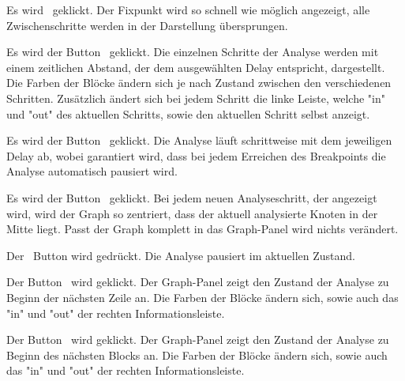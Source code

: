 \tests{}

{Es wird \faPlay\ geklickt.}
{Der Fixpunkt wird so schnell wie möglich angezeigt, alle Zwischenschritte werden in der Darstellung übersprungen.}

{Es wird der Button \faPlay\ geklickt.}
{Die einzelnen Schritte der Analyse werden mit einem zeitlichen Abstand, der dem ausgewählten Delay entspricht, dargestellt. Die Farben der Blöcke ändern sich je nach Zustand zwischen den verschiedenen Schritten. Zusätzlich ändert sich bei jedem Schritt die linke Leiste, welche "in" und "out" des aktuellen Schritts, sowie den aktuellen Schritt selbst anzeigt.}

{Es wird der Button \faPlay\ geklickt.}
{Die Analyse läuft schrittweise mit dem jeweiligen Delay ab, wobei garantiert wird, dass bei jedem Erreichen des Breakpoints die Analyse automatisch pausiert wird.}

{Es wird der Button \faPlay\ geklickt.}
{Bei jedem neuen Analyseschritt, der angezeigt wird, wird der Graph so zentriert, dass der aktuell analysierte Knoten in der Mitte liegt. Passt der Graph komplett in das Graph-Panel wird nichts verändert.}


\tests{}

{Der \faStop\ Button wird gedrückt.}
{Die Analyse pausiert im aktuellen Zustand.}

{Der Button \faForward\ wird geklickt.}
{Der Graph-Panel zeigt den Zustand der Analyse zu Beginn der nächsten Zeile an. Die Farben der Blöcke ändern sich, sowie auch das "in" und "out" der rechten Informationsleiste.}

{Der Button \faFastForward\ wird geklickt.}
{Der Graph-Panel zeigt den Zustand der Analyse zu Beginn des nächsten Blocks an. Die Farben der Blöcke ändern sich, sowie auch das "in" und "out" der rechten Informationsleiste.}

